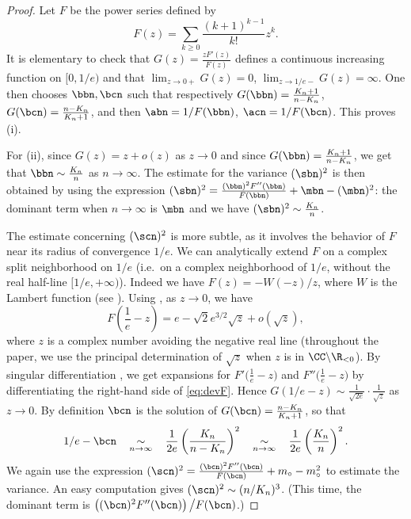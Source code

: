 \begin{proof}Let $F$ be the power series defined by
\begin{equation}
\label{eq:F}F(z)= \sum_{k \geq 0} \frac{(k+1)^{k-1}}{k!} z^{k}.
\end{equation}
It is elementary to check that $G(z)= \frac{z F'(z)}{F(z)}$ defines a continuous increasing function on $[0,1/e)$ and that $\lim_{z \rightarrow 0+} G(z)=0$, $\lim_{z \rightarrow 1/e-} G(z)=\infty$. One then chooses $\bbn, \bcn$ such that respectively $G(\bbn)=\frac{K_{n}+1}{n-K_{n}}$, $G(\bcn)= \frac{n-K_{n}}{K_{n}+1}$, and then $\abn=1/F(\bbn)$, $\acn=1/F(\bcn)$.
This proves (i).

For (ii), since $G(z)=z+o(z)$ as $z \rightarrow 0$ and since $G(\bbn)= \frac{K_{n}+1}{n-K_{n}}$, we get that $\bbn \sim \frac{K_{n}}{n}$ as $n \rightarrow \infty$.
The estimate for the variance $(\sbn)^{2}$ is then obtained by using the expression
\hbox{$(\sbn)^{2}= \frac{(\bbn)^{2} F''(\bbn)}{F(\bbn)}+\mbn-(\mbn)^{2}$:}
the dominant term when $n  \rightarrow \infty$ is $\mbn$
and we have \hbox{$(\sbn)^{2}\sim \frac{K_{n}}{n}$}.


The estimate concerning $(\scn)^{2}$ is more subtle, as it involves the behavior of $F$ near its radius of convergence $1/e$.
We can analytically extend $F$
on a complex split neighborhood on $1/e$ (i.e.\ on a complex neighborhood of $1/e$, without the real half-line $[1/e,+\infty)$).
Indeed we have $F(z)=-W(-z)/z$, where $W$ is the Lambert function (see \cite[Eq~3.1]{CGHJK96}).
Using \cite[Eq~4.22]{CGHJK96}, as $z \rightarrow 0$, we have
\begin{equation}
\label{eq:devF}F \left( \frac{1}{e}-z \right)=e- \sqrt{2} e^{3/2} \sqrt{z}+ o(\sqrt{z}),
\end{equation}
where $z$ is a complex number avoiding the negative real line
(throughout the paper, we use the principal determination of
$\sqrt{z}$ when $z$ is in $\CC \backslash \R_{<0}$).
By singular differentiation \cite[Theorem VI.8 p. 419]{FS09},
we get expansions for $F' \big( \tfrac{1}{e}-z \big)$ and $F'' \big( \tfrac{1}{e}-z \big)$
by differentiating the right-hand side of \eqref{eq:devF}.
Hence $G(1/e-z) \sim \frac{1}{\sqrt{2e}} \cdot \frac{1}{\sqrt{z}}$ as $z \rightarrow 0$.
By definition $\bcn$ is the solution of $G(\bcn)=\tfrac{n-K_n}{K_n+1}$, so that
\begin{equation}
  1/e-\bcn  \quad \mathop{\sim}_{n \rightarrow \infty} \quad  \frac{1}{2e} \left( \frac{K_n}{n-K_n}  \right)^{2}  \quad \mathop{\sim}_{n \rightarrow \infty} \quad  \frac{1}{2e} \left( \frac{K_n}{n}  \right)^{2}.
  \label{eq:est_bcirc}
\end{equation}
We again use the expression \hbox{$(\scn)^{2}= \frac{(\bcn)^{2} F''(\bcn)}{F(\bcn)}+m_{\circ}-m_{\circ}^{2}$}
to estimate the variance.
An easy computation gives $(\scn)^{2}\sim ( {n}/{K_{n}} )^{3}$.
(This time, the dominant term is $\left({(\bcn)^{2} F''(\bcn)}\right)\big/{F(\bcn)}$.)
\end{proof}
